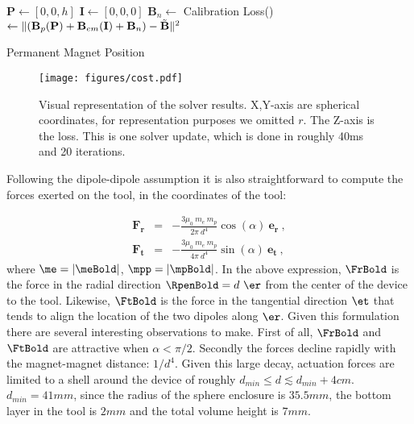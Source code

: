 \begin{algorithm}
\SetAlgoLined
{}

 $\mathbf{P} \leftarrow [0,0,h]$
 $\mathbf{I} \leftarrow [0,0,0]$\;
 $\mathbf{B}_n \leftarrow$ Calibration\;
 Loss() $\leftarrow \| (\mathbf{B}_{p}(\mathbf{P})+\mathbf{B}_{em}(\mathbf{I}) + \mathbf{B}_{n}) - \Tilde{\mathbf{B}}\|^2$\;
 \caption{Permanent Magnet Position}
 \label{algo:postion}
\end{algorithm}

\begin{figure}
    \centering
    \def\svgwidth{\columnwidth}
    \texttt{[image: figures/cost.pdf]}
    \caption{Visual representation of the solver results. X,Y-axis are spherical coordinates, for representation purposes we omitted $r$. The Z-axis is the loss. This is one solver update, which is done in roughly 40ms and 20 iterations.}
    \label{fig:cost}
\end{figure}

Following the dipole-dipole assumption it is also straightforward to compute the forces exerted on the tool, in the coordinates of the tool:

\begin{eqnarray}
    \mathbf{F_{r}} &=& - \frac{3 \mu_0 \ m_{e} \ m_{p}}{2 \pi \ d^4} \cos(\alpha) \ \mathbf{e_{r}} \label{eq:Fr}\ ,\\ 
    \mathbf{F_{t}} &=& - \frac{3 \mu_0 \ m_{e} \ m_{p}}{4 \pi \ d^4} \sin(\alpha) \ \mathbf{e_{t}} \label{eq:Ft}\ ,
\end{eqnarray}
where $\me=|\meBold|$, $\mpp=|\mpBold|$. In the above expression, $\FrBold$ is the force in the radial direction $\RpenBold = d \ \er$ from the center of the device to the tool. Likewise, $\FtBold$ is the force in the tangential direction $\et$ that tends to align the location of the two dipoles along $\er$. Given this formulation there are several interesting observations to make. First of all, $\FrBold$ and $\FtBold$ are attractive when $\alpha < \pi / 2$. Secondly the forces decline rapidly with the magnet-magnet distance: $1/d^4$. Given this large decay, actuation forces are limited to a shell around the device of roughly $d_{min} \leq d \lesssim d_{min} + 4cm$. $d_{min}=41mm$, since the radius of the sphere enclosure is $35.5mm$, the bottom layer in the tool is $2mm$ and the total volume height is $7mm$. 

